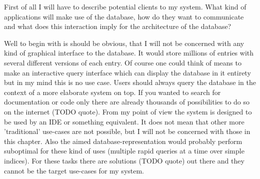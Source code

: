 \documentclass[twoside, 11pt]{scrartcl}
\begin{document}
First of all I will have to describe potential clients to my system. What kind of applications will make use of the database, how do they want to communicate and what does this interaction imply for the architecture of the database?

Well to begin with is should be obvious, that I will not be concerned with any kind of graphical interface to the database. It would store millions of entries with several different versions of each entry. Of course one could think of means to make an interactive query interface which can display the database in it entirety but in my mind this is no use case. Users should always query the database in the context of a more elaborate system on top. If you wanted to search for documentation or code only there are already thousands of possibilities to do so on the internet (TODO quote).
From my point of view the system is designed to be used by an IDE or something equivalent. It does not mean that other more 'traditional' use-cases are not possible, but I will not be concerned with those in this chapter. Also the aimed database-representation would probably perform suboptimal for these kind of uses (multiple rapid queries at a time over simple indices). For these tasks there are solutions (TODO quote) out there and they cannot be the target use-cases for my system.
\end{document}
